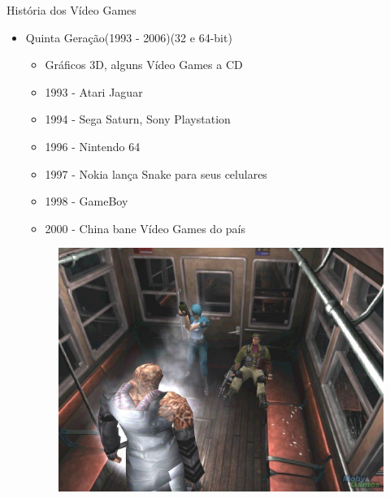 \documentclass[xcolor=svgnames,handout]{beamer}
\begin{document}
	\begin{frame}{História dos Vídeo Games}
		\begin{itemize}
	\item Quinta Geração(1993 - 2006)(32 e 64-bit)\pause
	\begin{itemize}
		\item Gráficos 3D, alguns Vídeo Games a CD\pause
		\item 1993 - Atari Jaguar\pause
		\item 1994 - Sega Saturn, Sony Playstation\pause
		\item 1996 - Nintendo 64\pause
		\item 1997 - Nokia lança Snake para seus celulares\pause
		\item 1998 - GameBoy\pause
		\item 2000 - China bane Vídeo Games do país\pause
		\end{itemize}
				\begin{figure}[t]
			    \centering
				    \includegraphics[scale=0.15]{imagens/re3}
				\end{figure}
\end{itemize}
\end{frame}
\end{document}
